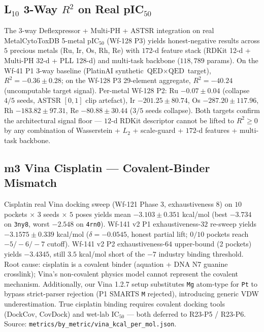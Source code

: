 \subsection{L$_{10}$ 3-Way $R^2$ on Real pIC$_{50}$}
\label{sec:limit-l10}

The 3-way Deflexpressor + Multi-PH + ASTSR integration on real
MetalCytoToxDB 5-metal pIC$_{50}$ (Wf-128 P3) yields honest-negative
results across $5$ precious metals (Ru, Ir, Os, Rh, Re) with $172$-d
feature stack (RDKit 12-d + Multi-PH 32-d + PLL 128-d) and multi-task
backbone ($118{,}789$ params).  On the Wf-41 P1 3-way baseline
(PlatinAI synthetic $\text{QED} \times \text{QED}$ target), $R^2 =
-0.36 \pm 0.28$; on the Wf-128 P3 29-element aggregate, $R^2 =
-40.24$ (uncomputable target signal).  Per-metal Wf-128 P2: Ru
$-0.07 \pm 0.04$ (collapse $4/5$ seeds, ASTSR $[0,1]$ clip
artefact), Ir $-201.25 \pm 80.74$, Os $-287.20 \pm 117.96$, Rh
$-183.82 \pm 97.31$, Re $-80.88 \pm 30.44$ ($3/5$ seeds collapse).
Both targets confirm the architectural signal floor --- $12$-d RDKit
descriptor cannot be lifted to $R^2 \geq 0$ by any combination of
Wasserstein + $L_2$ + scale-guard + $172$-d features + multi-task
backbone.

\subsection{m3 Vina Cisplatin --- Covalent-Binder Mismatch}
\label{sec:limit-vina-cisplatin}

Cisplatin real Vina docking sweep (Wf-121 Phase 3, exhaustiveness 8)
on $10$ pockets $\times$ $3$ seeds $\times$ $5$ poses yields mean
$-3.103 \pm 0.351$ kcal/mol (best $-3.734$ on \texttt{3ny8}, worst
$-2.548$ on \texttt{4rn0}).  Wf-141 v2 P1 exhaustiveness-$32$ re-sweep
yields $-3.1575 \pm 0.339$ kcal/mol ($\delta = -0.0545$, honest partial
lift; $0/10$ pockets reach $-5/-6/-7$ cutoff).  Wf-141 v2 P2
exhaustiveness-$64$ upper-bound (2 pockets) yields $-3.4345$, still
$3.5$ kcal/mol short of the $-7$ industry binding threshold.
Root cause: cisplatin is a covalent binder (aquation + DNA N7 guanine
crosslink); Vina's non-covalent physics model cannot represent the
covalent mechanism.  Additionally, our Vina 1.2.7 setup substitutes
\texttt{Mg} atom-type for \texttt{Pt} to bypass strict-parser rejection
(P1 SMARTS \texttt{M} rejected), introducing generic VDW
underestimation.  True cisplatin binding requires covalent docking
tools (DockCov, CovDock) and wet-lab IC$_{50}$ --- both deferred to
R23-P5 / R23-P6.  Source:
\texttt{metrics/by\_metric/vina\_kcal\_per\_mol.json}.

